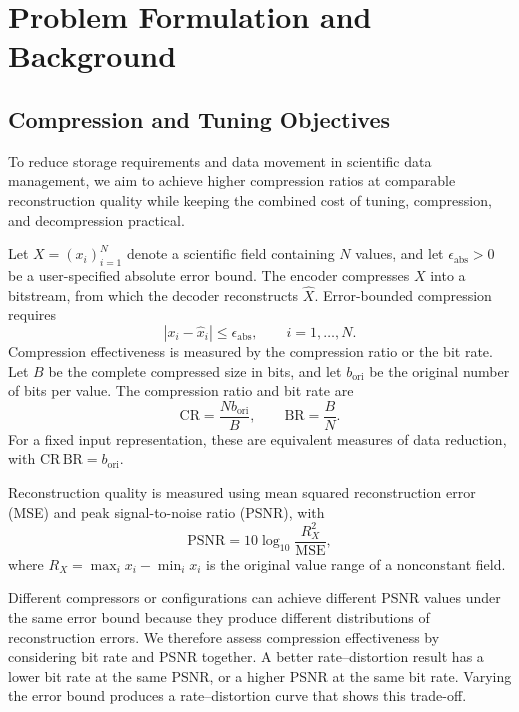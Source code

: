 \section{Problem Formulation and Background}
\label{sec:background}

\subsection{Compression and Tuning Objectives}
\label{sec:background:problem}

To reduce storage requirements and data movement in scientific data management, we aim to achieve higher compression ratios at comparable reconstruction quality while keeping the combined cost of tuning, compression, and decompression practical.

Let $X=(x_i)_{i=1}^{N}$ denote a scientific field containing $N$ values, and let $\epsilon_{\mathrm{abs}}>0$ be a user-specified absolute error bound. The encoder compresses $X$ into a bitstream, from which the decoder reconstructs $\hat X$. Error-bounded compression requires
\begin{equation}
\label{eq:background:error-bound}
|x_i-\hat x_i|\leq\epsilon_{\mathrm{abs}},\qquad i=1,\ldots,N.
\end{equation}
Compression effectiveness is measured by the compression ratio or the bit rate. Let $B$ be the complete compressed size in bits, and let $b_{\mathrm{ori}}$ be the original number of bits per value. The compression ratio and bit rate are
\begin{equation}
\label{eq:background:rate}
\mathrm{CR}=\frac{Nb_{\mathrm{ori}}}{B},\qquad \mathrm{BR}=\frac{B}{N}.
\end{equation}
For a fixed input representation, these are equivalent measures of data reduction, with $\mathrm{CR}\,\mathrm{BR}=b_{\mathrm{ori}}$.

Reconstruction quality is measured using mean squared reconstruction error (MSE) and peak signal-to-noise ratio (PSNR), with
\begin{equation}
\label{eq:background:quality}
\mathrm{PSNR}=10\log_{10}\frac{R_X^2}{\mathrm{MSE}},
\end{equation}
where $R_X=\max_i x_i-\min_i x_i$ is the original value range of a nonconstant field.

Different compressors or configurations can achieve different PSNR values under the same error bound because they produce different distributions of reconstruction errors. We therefore assess compression effectiveness by considering bit rate and PSNR together. A better rate--distortion result has a lower bit rate at the same PSNR, or a higher PSNR at the same bit rate. Varying the error bound produces a rate--distortion curve that shows this trade-off.

